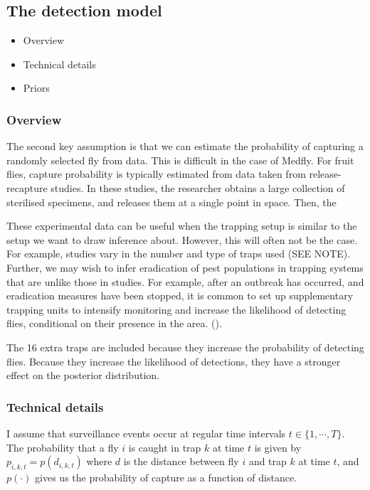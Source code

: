 \documentclass[
]{book}
\providecommand{\tightlist}{%
  \setlength{\itemsep}{0pt}\setlength{\parskip}{0pt}}
\begin{document}
\hypertarget{the-detection-model}{%
\subsection{The detection model}\label{the-detection-model}}

\begin{itemize}
\tightlist
\item
  Overview
\item
  Technical details
\item
  Priors
\end{itemize}

\hypertarget{overview-1}{%
\subsubsection{Overview}\label{overview-1}}

The second key assumption is that we can estimate the probability of capturing a randomly selected fly from data. This is difficult in the case of Medfly. For fruit flies, capture probability is typically estimated from data taken from release-recapture studies. In these studies, the researcher obtains a large collection of sterilised specimens, and releases them at a single point in space. Then, the

These experimental data can be useful when the trapping setup is similar to the setup we want to draw inference about. However, this will often not be the case. For example, studies vary in the number and type of traps used (SEE NOTE). Further, we may wish to infer eradication of pest populations in trapping systems that are unlike those in studies. For example, after an outbreak has occurred, and eradication measures have been stopped, it is common to set up supplementary trapping units to intensify monitoring and increase the likelihood of detecting flies, conditional on their presence in the area. (\citet{supp_traps}).

The 16 extra traps are included because they increase the probability of detecting flies. Because they increase the likelihood of detections, they have a stronger effect on the posterior distribution.

\hypertarget{technical-details-1}{%
\subsubsection{Technical details}\label{technical-details-1}}

I assume that surveillance events occur at regular time intervals \(t \in \{1, \cdots, T\}\). The probability that a fly \(i\) is caught in trap \(k\) at time \(t\) is given by \(p_{i, k, t} = p(d_{i, k, t})\) where \(d\) is the distance between fly \(i\) and trap \(k\) at time \(t\), and \(p(\cdot)\) gives us the probability of capture as a function of distance.
\end{document}
